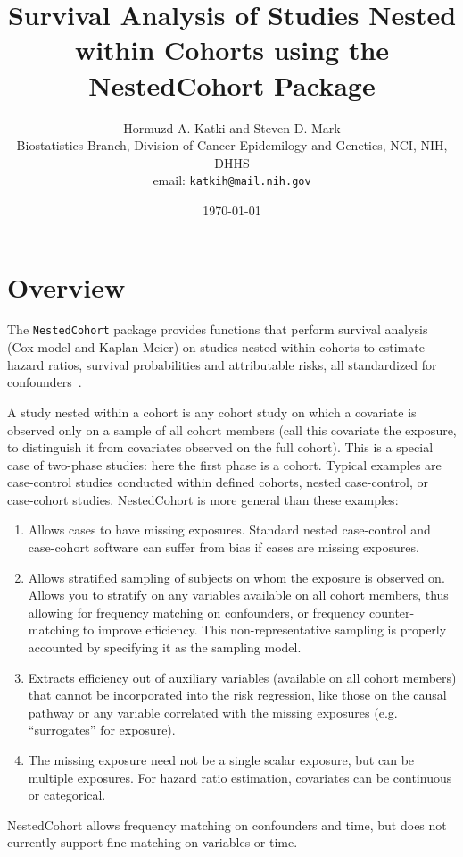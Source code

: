 \documentclass[10pt]{article}
\begin{document}


\title{Survival Analysis of Studies Nested within Cohorts using the NestedCohort Package}
\author{Hormuzd A. Katki and Steven D. Mark \\
Biostatistics Branch, Division of Cancer Epidemilogy and Genetics, NCI, NIH, DHHS \\
email: \texttt{katkih@mail.nih.gov}}
\date{\today}
\maketitle
\tableofcontents


\section{Overview}
\label{sec:overview}

The \texttt{NestedCohort} package provides functions that perform survival analysis (Cox
model and Kaplan-Meier) on studies nested within cohorts to estimate hazard ratios,
survival probabilities and attributable risks, all standardized for
confounders~\cite{Mark:Katki:06}.  

A study nested within a cohort is any cohort study on which a covariate is observed only
on a sample of all cohort members (call this covariate the exposure, to distinguish it
from covariates observed on the full cohort).  This is a special case of two-phase
studies: here the first phase is a cohort.  Typical examples are case-control studies
conducted within defined cohorts, nested case-control, or case-cohort studies.
NestedCohort is more general than these examples:
\begin{enumerate}
\item Allows cases to have missing exposures.  Standard nested case-control and
  case-cohort software can suffer from bias if cases are missing exposures.
\item Allows stratified sampling of subjects on whom the exposure is observed on.  Allows
  you to stratify on any variables available on all cohort members, thus allowing for
  frequency matching on confounders, or frequency counter-matching to improve efficiency.
  This non-representative sampling is properly accounted by specifying it as the sampling
  model.
\item Extracts efficiency out of auxiliary variables (available on all cohort members)
  that cannot be incorporated into the risk regression, like those on the causal pathway or
  any variable correlated with the missing exposures (e.g. ``surrogates'' for exposure).
\item The missing exposure need not be a single scalar exposure, but can be multiple
  exposures.  For hazard ratio estimation, covariates can be continuous or categorical.
\end{enumerate}
NestedCohort allows frequency matching on confounders and time, but does not currently
support fine matching on variables or time.
\end{document}
